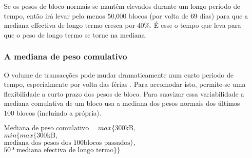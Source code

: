 Se os pesos de bloco normais se mantêm elevados durante um longo periodo de tempo, então irá levar pelo menos 50,000 blocos (por volta de 69 dias) para que a mediana effectiva de longo termo cresca por 40\%. É esse o tempo que leva para que o peso de longo termo se torne na mediana.

\subsubsection{A mediana de peso comulativo}

O volume de transacções pode mudar dramaticamente num curto periodo de tempo, especialmente por volta das férias \cite{visa-seasonality}. Para accomodar isto, permite-se uma flexibilidade a curto prazo dos pesos de bloco.
Para suavizar essa variabilidade a mediana comulativa de um bloco usa a mediana dos pesos normais dos últimos 100 blocos (incluíndo a própria). 

$\textrm{Mediana\ de\ peso\ comulativo} = max\{\textrm{300kB},$\\ 
$min\{max\{\textrm{300kB},$\\
$\textrm{mediana\ dos\ pesos\ dos\ 100blocos\ passados}\},$\\
$50*\textrm{mediana\ efectiva\ de\ longo\ termo}\}\}$

